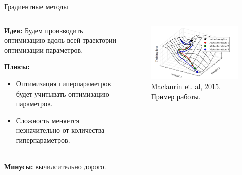 \documentclass[10pt,pdf,utf8,russian,aspectratio=169]{beamer}
\begin{document}
\begin{frame}{Градиентные методы}
\begin{columns}
\begin{column}{0.5\textwidth}
\textbf{Идея:}
Будем производить оптимизацию вдоль всей траектории оптимизации параметров.

\textbf{Плюсы:}
\begin{itemize}
\item Оптимизация гиперпараметров будет учитывать оптимизацию параметров.
\item Сложность меняется незначительно от количества гиперпараметров.
\end{itemize}

~\\
\textbf{Минусы:} вычилсительно дорого.

\end{column}
\begin{column}{0.4\textwidth}
\begin{figure}[h]
\includegraphics[width=\textwidth]{./grad.png}
\caption*{Maclaurin et. al, 2015. Пример работы.}
\end{figure}

\end{column}
\end{columns}

\end{frame}
\end{document}
